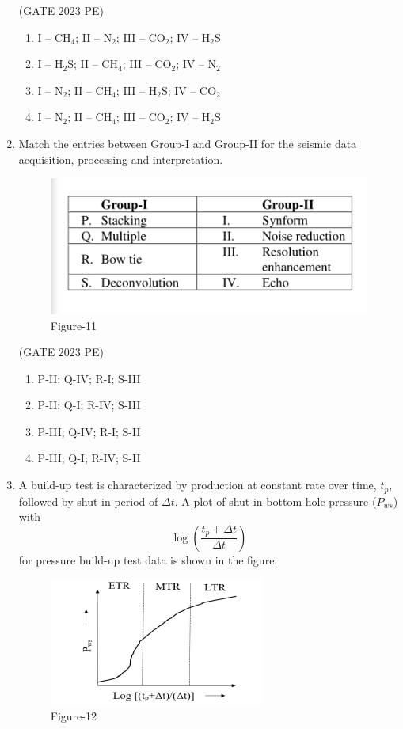\documentclass[journal,12pt,onecolumn]{exam}
\theoremstyle{remark}
\begin{document}
\begin{enumerate}
\hfill{(GATE 2023 PE)}\\
\begin{enumerate}
   \item I -- CH$_4$; II -- N$_2$; III -- CO$_2$; IV -- H$_2$S
\item I -- H$_2$S; II -- CH$_4$; III -- CO$_2$; IV -- N$_2$
\item I -- N$_2$; II -- CH$_4$; III -- H$_2$S; IV -- CO$_2$
\item I -- N$_2$; II -- CH$_4$; III -- CO$_2$; IV -- H$_2$S
\end{enumerate}
\item Match the entries between Group-I and Group-II for the seismic data acquisition, processing and interpretation.
\begin{figure}[H]
    \centering
    \includegraphics[width=0.5\linewidth]{figs/fig11.png}
    \caption{Figure-11}
    \label{fig:figs/fig11.png}
\end{figure}

\hfill{(GATE 2023 PE)}\\
\begin{enumerate}
    \item P-II; Q-IV; R-I; S-III
    \item P-II; Q-I; R-IV; S-III
    \item P-III; Q-IV; R-I; S-II
    \item P-III; Q-I; R-IV; S-II
\end{enumerate}
\item A build-up test is characterized by production at constant rate over time, $t_p$, 
followed by shut-in period of $\Delta t$. A plot of shut-in bottom hole pressure ($P_{ws}$) with 
\[
\log \left( \frac{t_p + \Delta t}{\Delta t} \right)
\]
for pressure build-up test data is shown in the figure.
\begin{figure}[H]
    \centering
    \includegraphics[width=0.5\linewidth]{figs/fig12.png}
    \caption{Figure-12}
    \label{fig:figs/fig12.png}
\end{figure}


\end{enumerate}
\end{document}
